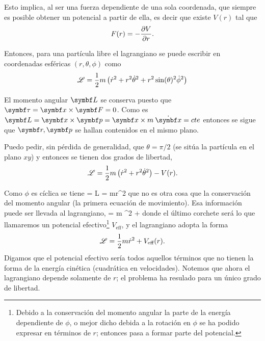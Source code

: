 \documentclass[10pt,oneside]{CBFT_book}
\begin{document}
Esto implica, al ser una fuerza dependiente de una sola coordenada, que siempre es posible obtener un potencial
a partir de ella, es decir que existe $V(r)$ tal que
\[
	F(r) = - \frac{\partial^{\hspace{-0.05em}} {V}}{\partial {r}^{\hspace{-0.05em}}}.
\]

Entonces, para una partícula libre el lagrangiano se puede escribir en coordenadas esféricas $(r,\theta,\phi)$ como
\[
	\mathscr{L} = \frac{1}{2}m \left( \dot{r}^2 + r^2 \dot{\theta}^2 + r^2 \sin(\theta)^2\dot{\phi}^2 \right)
\]

El momento angular $\vb{L}$ se conserva puesto que $\vb{\tau} = \vb{x} \times \vb{F}=0$. Como es 
$\vb{L} = \vb{x} \times \vb{p} = \vb{x} \times m \: \dot{\vb{x}} = cte$ entonces se sigue que $\vb{r},\vb{p}$
se hallan contenidos en el mismo plano.

Puedo pedir, sin pérdida de generalidad, que $\theta=\pi/2$ (se sitúa la partícula en el plano $xy$) y entonces
se tienen dos grados de libertad,
\[
	\mathscr{L} = \frac{1}{2}m \left( \dot{r}^2 + r^2 \dot{\theta}^2 \right) - V(r).
\]

Como $\phi$ es cíclica se tiene
\be
	\dpar{\Lag}{\dot{\phi}} = L = mr^2\dot{\phi}
	\label{ec_mov_uno}
\ee
que no es otra cosa que la conservación del momento angular (la primera ecuación de movimiento). Esa información puede 
ser llevada al lagrangiano,
\be
	\Lag = m ^2 + 
	\label{lag_pot_central}
\ee
donde el último corchete será lo que llamaremos un potencial efectivo\footnote{Debido a la conservación del momento 
angular la parte de la energía dependiente de $\phi$, o mejor dicho debida a la rotación en $\phi$ se ha podido 
expresar en términos de $r$; entonces pasa a formar parte del potencial.} $V_{\text{eff}}$, y 
el lagrangiano adopta la forma
\[
	\mathscr{L} = \frac{1}{2}m \dot{r}^2 + V_{\text{eff}}(r).
\]
Digamos que el potencial efectivo sería todos aquellos términos que no tienen la forma de la energía cinética 
(cuadrática en velocidades).
Notemos que ahora el lagrangiano depende solamente de $r$; el problema ha resulado para un único grado de libertad.
\end{document}
